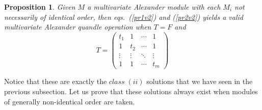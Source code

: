 \documentclass[a4paper,12pt]{article}
\newtheorem{proposition}{Proposition}[section]
\begin{document}
\begin{proposition}  
Given $M$ a multivariate Alexander module with each $M_i$ not necessarily of  identical order,  then eqs.~(\ref{pr1v2}) and (\ref{pr2v2})  yields a valid multivariate Alexander quandle operation when $T = F$ and  
\[ T =  \begin{pmatrix}
    t_{1} & 1 & \cdots & 1 \\
    1 & t_{2} & \cdots & 1 \\
    \vdots & \vdots & \ddots & \vdots \\
    1 & 1 & \cdots & t_{m}
\end{pmatrix}    \]
\end{proposition}

Notice that these are exactly the $class \; (ii)$ solutions that we have seen in the previous subsection. Let us prove that these solutions always exist when modules of generally non-identical order are taken. 
\end{document}

